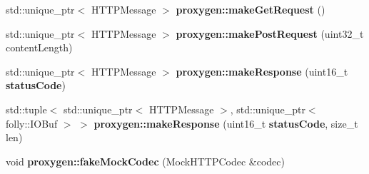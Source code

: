 \begin{DoxyCompactItemize}
\item 
std\+::unique\+\_\+ptr$<$ H\+T\+T\+P\+Message $>$ {\bf proxygen\+::make\+Get\+Request} ()
\item 
std\+::unique\+\_\+ptr$<$ H\+T\+T\+P\+Message $>$ {\bf proxygen\+::make\+Post\+Request} (uint32\+\_\+t content\+Length)
\item 
std\+::unique\+\_\+ptr$<$ H\+T\+T\+P\+Message $>$ {\bf proxygen\+::make\+Response} (uint16\+\_\+t {\bf status\+Code})
\item 
std\+::tuple$<$ std\+::unique\+\_\+ptr$<$ H\+T\+T\+P\+Message $>$, std\+::unique\+\_\+ptr$<$ folly\+::\+I\+O\+Buf $>$ $>$ {\bf proxygen\+::make\+Response} (uint16\+\_\+t {\bf status\+Code}, size\+\_\+t len)
\item 
void {\bf proxygen\+::fake\+Mock\+Codec} (Mock\+H\+T\+T\+P\+Codec \&codec)
\end{DoxyCompactItemize}
